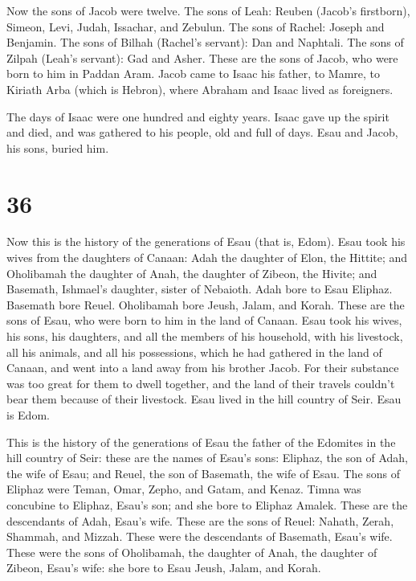 Now the sons of Jacob were twelve.  The sons of Leah:
Reuben (Jacob's firstborn), Simeon, Levi, Judah, Issachar, and Zebulun.
 The sons of Rachel: Joseph and Benjamin.  The
sons of Bilhah (Rachel's servant): Dan and Naphtali.  The
sons of Zilpah (Leah's servant): Gad and Asher. These are the sons of
Jacob, who were born to him in Paddan Aram.  Jacob came to
Isaac his father, to Mamre, to Kiriath Arba (which is Hebron), where
Abraham and Isaac lived as foreigners.

 The days of Isaac were one hundred and eighty years.
 Isaac gave up the spirit and died, and was gathered to his
people, old and full of days. Esau and Jacob, his sons, buried him.

\hypertarget{section-35}{%
\section{36}\label{section-35}}

 Now this is the history of the generations of Esau (that
is, Edom).  Esau took his wives from the daughters of
Canaan: Adah the daughter of Elon, the Hittite; and Oholibamah the
daughter of Anah, the daughter of Zibeon, the Hivite;  and
Basemath, Ishmael's daughter, sister of Nebaioth.  Adah bore
to Esau Eliphaz. Basemath bore Reuel.  Oholibamah bore
Jeush, Jalam, and Korah. These are the sons of Esau, who were born to
him in the land of Canaan.  Esau took his wives, his sons,
his daughters, and all the members of his household, with his livestock,
all his animals, and all his possessions, which he had gathered in the
land of Canaan, and went into a land away from his brother Jacob.
 For their substance was too great for them to dwell
together, and the land of their travels couldn't bear them because of
their livestock.  Esau lived in the hill country of Seir.
Esau is Edom.

 This is the history of the generations of Esau the father
of the Edomites in the hill country of Seir:  these are the
names of Esau's sons: Eliphaz, the son of Adah, the wife of Esau; and
Reuel, the son of Basemath, the wife of Esau.  The sons of
Eliphaz were Teman, Omar, Zepho, and Gatam, and Kenaz. 
Timna was concubine to Eliphaz, Esau's son; and she bore to Eliphaz
Amalek. These are the descendants of Adah, Esau's wife. 
These are the sons of Reuel: Nahath, Zerah, Shammah, and Mizzah. These
were the descendants of Basemath, Esau's wife.  These were
the sons of Oholibamah, the daughter of Anah, the daughter of Zibeon,
Esau's wife: she bore to Esau Jeush, Jalam, and Korah.

